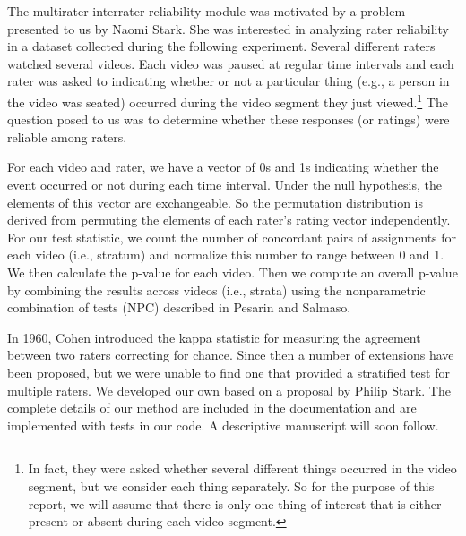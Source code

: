 The multirater interrater reliability module was motivated by a problem
presented to us by Naomi Stark.  She was interested in analyzing rater
reliability in a dataset collected during the following experiment.  Several
different raters watched several videos.  Each video was paused at regular time
intervals and each rater was asked to indicating whether or not a particular
thing (e.g., a person in the video was seated) occurred during the video
segment they just viewed.\footnote{In fact, they were asked whether several
different things occurred in the video segment, but we consider each thing
separately.  So for the purpose of this report, we will assume that there is
only one thing of interest that is either present or absent during each video
segment.} The question posed to us was to determine whether these responses (or
ratings) were reliable among raters. 

For each video and rater, we have a vector of 0s and 1s indicating whether the
event occurred or not during each time interval.  Under the null hypothesis,
the elements of this vector are exchangeable.  So the permutation distribution
is derived from permuting the elements of each rater's rating vector
independently.  For our test statistic, we count the number of concordant pairs
of assignments for each video (i.e., stratum) and normalize this number to
range between 0 and 1.  We then calculate the p-value for each video.  Then we
compute an overall p-value by combining the results across videos (i.e.,
strata) using the nonparametric combination of tests (NPC) described in Pesarin
and Salmaso.

In 1960, Cohen \cite{cohen1960} introduced the kappa statistic for measuring
the agreement between two raters correcting for chance.  Since then a number of
extensions have been proposed, but we were unable to find one that provided a
stratified test for multiple raters. We developed our own based on a proposal
by Philip Stark. The complete details of our method are included in the
documentation and are implemented with tests in our code.  A descriptive
manuscript will soon follow.
